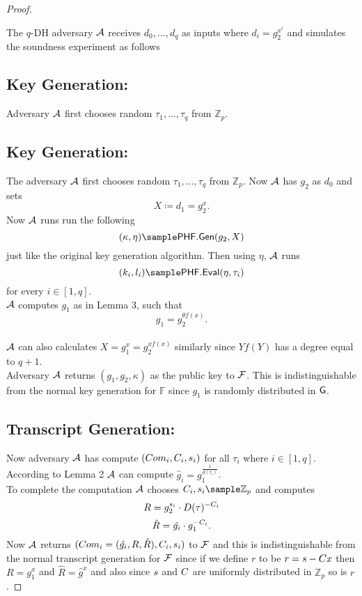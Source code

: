 \begin{proof}
\begin{figure}[htb!]
{\begin{minipage}[t]{0.7\textwidth}
\begin{nicodemus}
            
            \end{nicodemus}
        \end{minipage}
    }
    \caption{}
    \label{fig:x-soundess}
\end{figure}

The $q$-DH adversary $\mathcal{A}$ receives $d_0,...,d_q$ as inputs where $d_i = g_2^{x^i}$ and simulates the soundness experiment as follows
\subsection*{Key Generation:}
Adversary $\mathcal{A}$ first chooses random $\tau_1,...,\tau_q$ from $\mathbb{Z}_p$. 
\subsection*{Key Generation:} The adversary $\mathcal{A}$ first chooses random $\tau_1,...,\tau_q$ from $\mathbb{Z}_p$. 
Now $\mathcal{A}$ has $g_2$ as $d_0$ and sets 
$$X \coloneqq d_1 = g_2^x.$$
Now $\mathcal{A}$ runs run the following 
$$(\kappa, \eta)\sample \phfGen(g_2,X)$$
just like the original key generation algorithm. Then using $\eta$, $\mathcal{A}$ runs 
$$(k_i,l_i) \sample \phfEval(\eta,\tau_i)$$
for every $i \in [1,q]$.
\\
$\mathcal{A}$ computes $g_1$ as in Lemma 3, such that
$$g_1 = g_2^{\theta f(x)}.$$
\\
$\mathcal{A}$ can also calculates 
$X = g_1^x = g_2^{xf(x)}$ similarly since $Yf(Y)$ has a degree equal to $q+1$.
\\
Adversary $\mathcal{A}$ returns $(g_1,g_2,\kappa)$ as the public key to $\mathcal{F}$. This is indistinguishable from the normal key generation for $\mathbb{F}$ since $g_1$ is randomly distributed in $\mathsf{G}$.

\subsection*{Transcript Generation:}
Now adversary $\mathcal{A}$ has compute $(Com_i,C_i,s_i)$ for all $\tau_i$ where $i \in [1,q]$.
\\
According to Lemma 2 $\mathcal{A}$ can compute $\hat{g}_i = g_1^{\frac{1}{d(\tau_i)}}$.
\\
To complete the computation $\mathcal{A}$ chooses  $\c_i,\s_i\sample\mathbb{Z}_p$ and computes
$$R = g_2^{s_i} \cdot D(\tau)^{-C_i}$$
$$ \hat{R} = \hat{g_i}\cdot g_1^{-C_i}.$$
Now $\mathcal{A}$ returns $(Com_i = (\hat{g_i},R,\hat{R}),C_i,s_i)$ to $\mathcal{F}$ and this is indistinguishable from the normal transcript generation for $\mathcal{F}$ since if we define $r$ to be $r = s-C x$ then $R = g_1^x$ and 
$\hat{R} = \hat{g}^x$ and also since $s$ and $C$ are uniformly distributed in $\mathbb{Z}_p$ so is $r$.
\end{proof}

